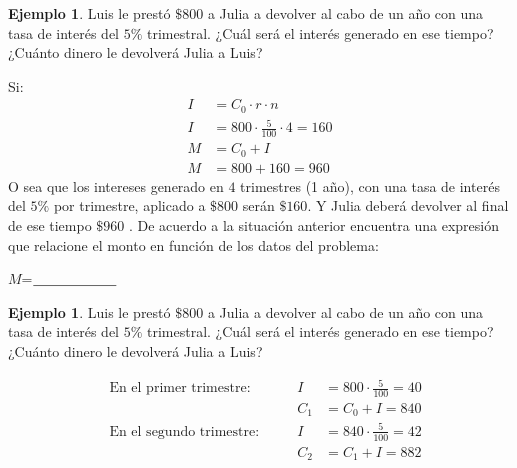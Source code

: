 \documentclass[12pt]{examdesign}
\theoremstyle{plain}
\theoremstyle{definition}
\newtheorem{exa}[theorem]{Ejemplo}
\theoremstyle{remark}
\begin{document}
\begin{endmatter}
    	\vspace{.2cm}
    	\begin{tcolorbox}[opteqC]
    		\begin{exa}
    		 Luis le prestó $\$800$ a Julia a devolver al cabo de un año con una tasa de interés del $5\%$ trimestral. ¿Cuál será el interés generado en ese tiempo? ¿Cuánto dinero le devolverá Julia a Luis?
    		\end{exa}
        \end{tcolorbox}
        Si:
        \begin{align}
        	I&=C_{0}\cdot r\cdot n\\
        	I&=800\cdot \frac{5}{100}\cdot 4=160\\
        	M&=C_{0}+I\\
        	M&=800+160=960
        \end{align}
        O sea que los intereses generado en $4$ trimestres (1 año), con una tasa de interés del $5\%$ por trimestre, aplicado a $\$800$ serán $\$160$. Y Julia deberá devolver al final de ese tiempo $\$960$
        .
        De acuerdo a la situación anterior encuentra una expresión que relacione el monto en función de los datos del problema:
        \begin{center}
        	\def\blank#1{$\underline{\mbox{\hphantom{#1}}}$}
        	$M$=\blank{------------------}
        \end{center}
        \vspace{.2cm}
        \begin{tcolorbox}[opteqC]
        	\begin{exa}
        		Luis le prestó $\$800$ a Julia a devolver al cabo de un año con una tasa de interés del $5\%$ trimestral. ¿Cuál será el interés generado en ese tiempo? ¿Cuánto dinero le devolverá Julia a Luis?
        	\end{exa}
        \end{tcolorbox}
        \begin{align*}
        	&\mbox{En el primer trimestre: }               &&&        I&=800\cdot\frac{5}{100}=40          \\
        	&                                              &&&      C_1&=C_{0}+I=840                       \\
        	&\mbox{En el segundo trimestre: }              &&&        I&=840\cdot \frac{5}{100}=42         \\
        	&                                              &&&      C_2&=C_{1}+I=882                       \\

\end{align*}
\end{endmatter}
\end{document}
